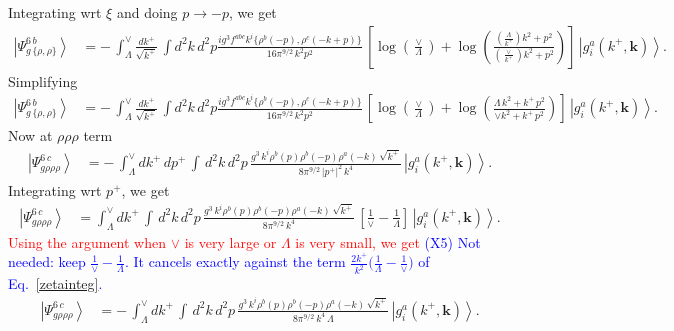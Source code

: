 \documentclass[aps,prd,amsmath,amssymb,nofootinbib]{revtex4-2}
\numberwithin{equation}{section}
\begin{document}
Integrating wrt $\xi$ and doing $p\rightarrow -p$, we get
\begin{align}
    \left|\Psi_{g\,\{\rho,\rho\}}^{6\, b}\right\rangle & =-\,\int_{\Lambda}^{\vee} \frac{dk^{+}}{\sqrt{k^{+}}}\, \int d^{2}k \, d^{2}p \frac{ig^{3}f^{abc}k^{i}\{\rho^{b}(-p),\rho^{c}(-k+p)\}}{16\pi^{9/2}\,k^{2}p^{2}}\,\left[\log{\left(\frac{\vee}{\Lambda}\right)}+\log{\left(\frac{\left(\frac{\Lambda}{k^{+}}\right) k^{2}+p^{2}}{\left(\frac{\vee}{k^{+}} \right)k^{2}+p^{2}}\right)}\right]\,\left|g_{i}^{a}(k^{+},\mathbf{k})\right\rangle.
\end{align}
Simplifying
\begin{align}\label{tworhoafter}
    \left|\Psi_{g\,\{\rho,\rho\}}^{6\, b}\right\rangle & =-\,\int_{\Lambda}^{\vee} \frac{dk^{+}}{\sqrt{k^{+}}}\, \int d^{2}k \, d^{2}p \frac{ig^{3}f^{abc}k^{i}\{\rho^{b}(-p),\rho^{c}(-k+p)\}}{16\pi^{9/2}\,k^{2}p^{2}}\,\left[\log{\left(\frac{\vee}{\Lambda}\right)}+\log{\left(\frac{\Lambda\, k^{2} + k^{+}\,p^{2}}{\vee k^{2}+k^{+}\,p^{2}}\right)}\right]\,\left|g_{i}^{a}(k^{+},\mathbf{k})\right\rangle.
\end{align}
Now at $\rho\rho\rho$ term
\begin{align}
    \left|\Psi_{g\rho\rho\rho}^{6\, c}\right\rangle & = -\, \int_{\Lambda}^{\vee} dk^{+}\, dp^{+}\, \int\, d^{2}k\, d^{2}p\, \frac{g^{3}\, k^{i}\rho^{b}(p)\rho^{b}(-p)\rho^{a}(-k)\,\sqrt{k^{+}}}{8\pi^{9/2}\,|p^{+}|^{2}\,k^{4}}\,\left|g_{i}^{a}(k^{+},\mathbf{k})\right\rangle. 
\end{align}
Integrating wrt $p^{+}$, we get
\begin{align}
    \left|\Psi_{g\rho\rho\rho}^{6\, c}\right\rangle & = \int_{\Lambda}^{\vee} dk^{+}\, \int\, d^{2}k\, d^{2}p\, \frac{g^{3}\, k^{i}\rho^{b}(p)\rho^{b}(-p)\rho^{a}(-k)\,\sqrt{k^{+}}}{8\pi^{9/2}\,k^{4}}\, \left[\frac{1}{\vee}-\frac{1}{\Lambda}\right]\,\left|g_{i}^{a}(k^{+},\mathbf{k})\right\rangle.
\end{align}
\textcolor{red}{Using the argument when $\vee$ is very large or $\Lambda$ is very small, we get} \textcolor{blue}{(X5) Not needed: keep $\frac{1}{\vee}-\frac{1}{\Lambda}$. It cancels exactly against the term $\frac{2k^{+}}{k^{2}}\big(\frac1\Lambda-\frac1\vee\big)$ of Eq.~\eqref{zetainteg}.}
\begin{align}\label{threerhoafter}
        \left|\Psi_{g\rho\rho\rho}^{6\, c}\right\rangle & = -\,\int_{\Lambda}^{\vee} dk^{+}\, \int\, d^{2}k\, d^{2}p\, \frac{g^{3}\, k^{i}\rho^{b}(p)\rho^{b}(-p)\rho^{a}(-k)\,\sqrt{k^{+}}}{8\pi^{9/2}\,k^{4}\, \Lambda}\,\left|g_{i}^{a}(k^{+},\mathbf{k})\right\rangle.
\end{align}
\end{document}
